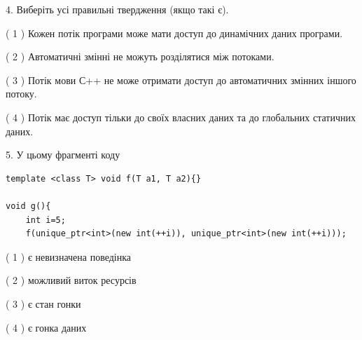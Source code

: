 \documentclass[12pt, ukrainian]{article}
\begin{document}
\begin {large}
{%
4. Виберіть усі правильні твердження (якщо такі є).\par
\vspace{2mm}

( 1 ) Кожен потік програми може мати доступ до динамічних даних програми.%

( 2 ) Автоматичні змінні не можуть розділятися між потоками.%

( 3 ) Потік мови С++ не може отримати доступ до автоматичних змінних іншого потоку.%

( 4 ) Потік має доступ тільки до своїх власних даних та до глобальних статичних даних.%


5. У цьому фрагменті коду
\begin{verbatim}
template <class T> void f(T a1, T a2){}

void g(){
    int i=5;
    f(unique_ptr<int>(new int(++i)), unique_ptr<int>(new int(++i)));
\end{verbatim}

( 1 ) є невизначена поведінка%

( 2 ) можливий виток ресурсів%

( 3 ) є стан гонки%

( 4 ) є гонка даних%
}
\end {large}
\end{document}
